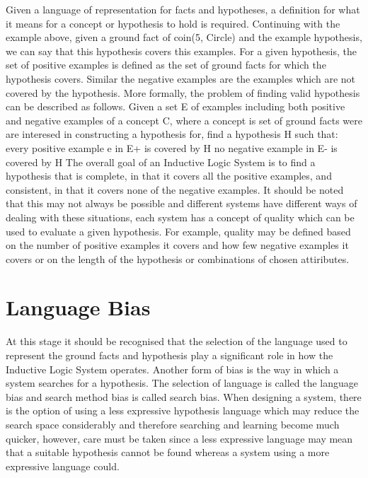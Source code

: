 \documentclass{article}
\begin{document}
Given a language of representation for facts and hypotheses, a definition for what it means for a concept or hypothesis to hold is required. Continuing with the example above, given a ground fact of coin(5, Circle) and the example hypothesis, we can say that this hypothesis covers this examples.
For a given hypothesis, the set of positive examples is defined as the set of ground facts for which the hypothesis covers. Similar the negative examples are the examples which are not covered by the hypothesis. More formally, the problem of finding valid hypothesis can be described as follows.
  Given a set E of examples including both positive and negative examples of a concept C, where a concept is set of ground facts were are interesed in constructing a hypothesis for, find a hypothesis H such that:
  every positive example e in E+ is covered by H
  no negative example in E- is covered by H
The overall goal of an Inductive Logic System is to find a hypothesis that is complete, in that it covers all the positive examples, and consistent, in that it covers none of the negative examples. It should be noted that this may not always be possible and different systems have different ways of dealing with these situations, each system has a concept of quality which can be used to evaluate a given hypothesis. For example, quality may be defined based on the number of positive examples it covers and how few negative examples it covers or on the length of the hypothesis or combinations of chosen attiributes.

\section{Language Bias}

At this stage it should be recognised that the selection of the language used to represent the ground facts and hypothesis play a significant role in how the Inductive Logic System operates. Another form of bias is the way in which a system searches for a hypothesis. The selection of language is called the language bias and search method bias is called search bias.
When designing a system, there is the option of using a less expressive hypothesis language which may reduce the search space considerably and therefore searching and learning become much quicker, however, care must be taken since a less expressive language may mean that a suitable hypothesis cannot be found whereas a system using a more expressive language could.


\end{document}
